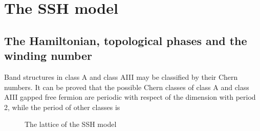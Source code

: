 \documentclass[hyperref, a4paper]{article}
\begin{document}
\section{The SSH model}

\subsection{The Hamiltonian, topological phases and the winding number}

Band structures in class A and class AIII may be classified by their Chern numbers. It can be proved that 
the possible Chern classes of class A and class AIII gapped free fermion are periodic with respect of the 
dimension with period 2, while the period of other classes is %

\begin{figure}
    \centering
    
    \caption{The lattice of the SSH model}
    \label{fig:ssh-lattice}
\end{figure}
\end{document}
